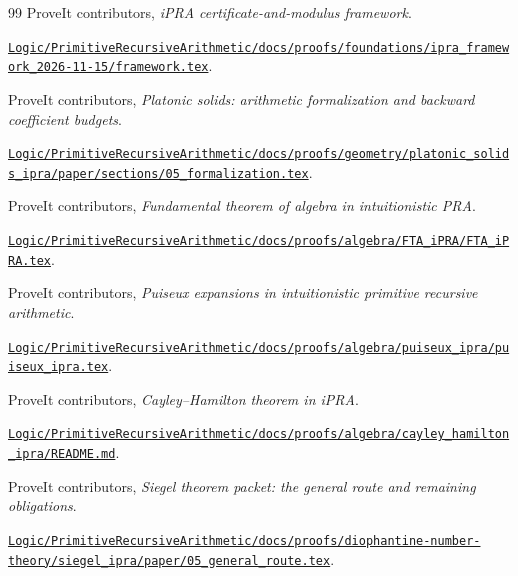 \begin{thebibliography}{99}
 ProveIt contributors, \emph{iPRA certificate-and-modulus framework}.\par\nopagebreak\href{https://github.com/VladimirReshetnikov/ProveIt/blob/052fbaebfc955294b4c02f6532ab7e7a3f760f7a/Logic/PrimitiveRecursiveArithmetic/docs/proofs/foundations/ipra_framework_2026-11-15/framework.tex}{\nolinkurl{Logic/PrimitiveRecursiveArithmetic/docs/proofs/foundations/ipra_framework_2026-11-15/framework.tex}}.

 ProveIt contributors, \emph{Platonic solids: arithmetic formalization and backward coefficient budgets}.\par\nopagebreak\href{https://github.com/VladimirReshetnikov/ProveIt/blob/052fbaebfc955294b4c02f6532ab7e7a3f760f7a/Logic/PrimitiveRecursiveArithmetic/docs/proofs/geometry/platonic_solids_ipra/paper/sections/05_formalization.tex}{\nolinkurl{Logic/PrimitiveRecursiveArithmetic/docs/proofs/geometry/platonic_solids_ipra/paper/sections/05_formalization.tex}}.

 ProveIt contributors, \emph{Fundamental theorem of algebra in intuitionistic PRA}.\par\nopagebreak\href{https://github.com/VladimirReshetnikov/ProveIt/blob/052fbaebfc955294b4c02f6532ab7e7a3f760f7a/Logic/PrimitiveRecursiveArithmetic/docs/proofs/algebra/FTA_iPRA/FTA_iPRA.tex}{\nolinkurl{Logic/PrimitiveRecursiveArithmetic/docs/proofs/algebra/FTA_iPRA/FTA_iPRA.tex}}.

 ProveIt contributors, \emph{Puiseux expansions in intuitionistic primitive recursive arithmetic}.\par\nopagebreak\href{https://github.com/VladimirReshetnikov/ProveIt/blob/052fbaebfc955294b4c02f6532ab7e7a3f760f7a/Logic/PrimitiveRecursiveArithmetic/docs/proofs/algebra/puiseux_ipra/puiseux_ipra.tex}{\nolinkurl{Logic/PrimitiveRecursiveArithmetic/docs/proofs/algebra/puiseux_ipra/puiseux_ipra.tex}}.

 ProveIt contributors, \emph{Cayley--Hamilton theorem in iPRA}.\par\nopagebreak\href{https://github.com/VladimirReshetnikov/ProveIt/blob/052fbaebfc955294b4c02f6532ab7e7a3f760f7a/Logic/PrimitiveRecursiveArithmetic/docs/proofs/algebra/cayley_hamilton_ipra/README.md}{\nolinkurl{Logic/PrimitiveRecursiveArithmetic/docs/proofs/algebra/cayley_hamilton_ipra/README.md}}.

 ProveIt contributors, \emph{Siegel theorem packet: the general route and remaining obligations}.\par\nopagebreak\href{https://github.com/VladimirReshetnikov/ProveIt/blob/052fbaebfc955294b4c02f6532ab7e7a3f760f7a/Logic/PrimitiveRecursiveArithmetic/docs/proofs/diophantine-number-theory/siegel_ipra/paper/05_general_route.tex}{\nolinkurl{Logic/PrimitiveRecursiveArithmetic/docs/proofs/diophantine-number-theory/siegel_ipra/paper/05_general_route.tex}}.


\end{thebibliography}
